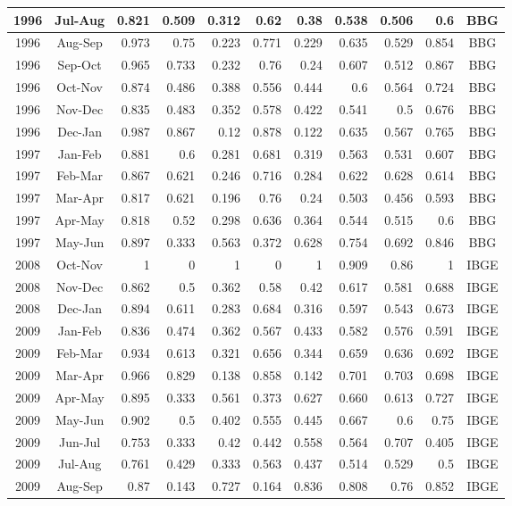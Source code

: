 \documentclass[11pt]{article}
\begin{document}
\begin{table}[h]
{\begin{tabular}{|c|c|r|r|r|r|r|r|r|r|c|}
1996 & Jul-Aug & 0.821 & 0.509 & 0.312 & 0.62   & 0.38   & 0.538 & 0.506 & 0.6   & BBG  \\ \hline
1996 & Aug-Sep & 0.973 & 0.75  & 0.223 & 0.771  & 0.229  & 0.635 & 0.529 & 0.854 & BBG  \\ \hline
1996 & Sep-Oct & 0.965 & 0.733 & 0.232 & 0.76   & 0.24   & 0.607 & 0.512 & 0.867 & BBG  \\ \hline
1996 & Oct-Nov & 0.874 & 0.486 & 0.388 & 0.556  & 0.444  & 0.6   & 0.564 & 0.724 & BBG  \\ \hline
1996 & Nov-Dec & 0.835 & 0.483 & 0.352 & 0.578  & 0.422  & 0.541 & 0.5   & 0.676 & BBG  \\ \hline
1996 & Dec-Jan & 0.987 & 0.867 & 0.12  & 0.878  & 0.122  & 0.635 & 0.567 & 0.765 & BBG  \\ \hline
1997 & Jan-Feb & 0.881 & 0.6   & 0.281 & 0.681  & 0.319  & 0.563 & 0.531 & 0.607 & BBG  \\ \hline
1997 & Feb-Mar & 0.867 & 0.621 & 0.246 & 0.716  & 0.284  & 0.622 & 0.628 & 0.614 & BBG  \\ \hline
1997 & Mar-Apr & 0.817 & 0.621 & 0.196 & 0.76   & 0.24   & 0.503 & 0.456 & 0.593 & BBG  \\ \hline
1997 & Apr-May & 0.818 & 0.52  & 0.298 & 0.636  & 0.364  & 0.544 & 0.515 & 0.6   & BBG  \\ \hline
1997 & May-Jun & 0.897 & 0.333 & 0.563 & 0.372  & 0.628  & 0.754 & 0.692 & 0.846 & BBG  \\ \hline
2008 & Oct-Nov & 1     & 0     & 1     & 0      & 1      & 0.909 & 0.86  & 1     & IBGE \\ \hline
2008 & Nov-Dec & 0.862 & 0.5   & 0.362 & 0.58   & 0.42   & 0.617 & 0.581 & 0.688 & IBGE \\ \hline
2008 & Dec-Jan & 0.894 & 0.611 & 0.283 & 0.684  & 0.316  & 0.597 & 0.543 & 0.673 & IBGE \\ \hline
2009 & Jan-Feb & 0.836 & 0.474 & 0.362 & 0.567  & 0.433  & 0.582 & 0.576 & 0.591 & IBGE \\ \hline
2009 & Feb-Mar & 0.934 & 0.613 & 0.321 & 0.656  & 0.344  & 0.659 & 0.636 & 0.692 & IBGE \\ \hline
2009 & Mar-Apr & 0.966 & 0.829 & 0.138 & 0.858  & 0.142  & 0.701 & 0.703 & 0.698 & IBGE \\ \hline
2009 & Apr-May & 0.895 & 0.333 & 0.561 & 0.373  & 0.627  & 0.660  & 0.613 & 0.727 & IBGE \\ \hline
2009 & May-Jun & 0.902 & 0.5   & 0.402 & 0.555  & 0.445  & 0.667 & 0.6   & 0.75  & IBGE \\ \hline
2009 & Jun-Jul & 0.753 & 0.333 & 0.42  & 0.442  & 0.558  & 0.564 & 0.707 & 0.405 & IBGE \\ \hline
2009 & Jul-Aug & 0.761 & 0.429 & 0.333 & 0.563  & 0.437  & 0.514 & 0.529 & 0.5   & IBGE \\ \hline
2009 & Aug-Sep & 0.87  & 0.143 & 0.727 & 0.164  & 0.836  & 0.808 & 0.76  & 0.852 & IBGE \\ \hline
\end{tabular}%
}
\end{table}
\end{document}
